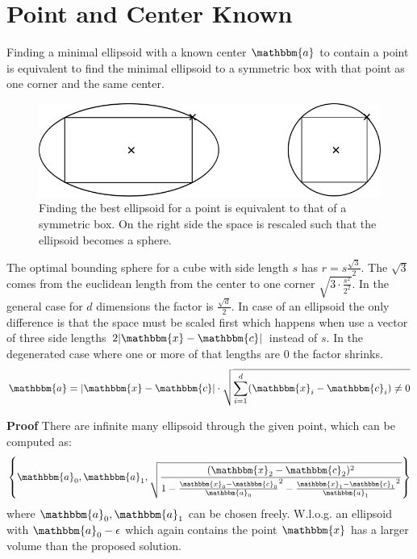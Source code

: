\documentclass[english,10pt,a4paper,twocolumn,colorscheme=green]{orarticle}
\begin{document}
	\section{Point and Center Known}
	
	Finding a minimal ellipsoid with a known center $\mathbbm{a}$ to contain a point is equivalent to find the minimal ellipsoid to a symmetric box with that point as one corner and the same center.
	
	\begin{figure}[h]
	\includegraphics[width=\linewidth]{img/ellipsoidpointfitting}
	\caption{Finding the best ellipsoid for a point is equivalent to that of a symmetric box. On the right side the space is rescaled such that the ellipsoid becomes a sphere.}
	\end{figure}
	The optimal bounding sphere for a cube with side length $s$ has $r = s\frac{\sqrt{3}}{2}$. The $\sqrt{3}$ comes from the euclidean length from the center to one corner $\sqrt{3\cdot\frac{s^2}{2^2}}$. In the general case for $d$ dimensions the factor is $\frac{\sqrt{d}}{2}$. In case of an ellipsoid the only difference is that the space must be scaled first which happens when use a vector of three side lengths $2\lvert\mathbbm{x}-\mathbbm{c}\rvert$ instead of $s$. In the degenerated case where one or more of that lengths are 0 the factor shrinks.
	\begin{align}
		\mathbbm{a} = \lvert\mathbbm{x}-\mathbbm{c}\rvert\cdot\sqrt{\sum_{i=1}^d (\mathbbm{x}_i-\mathbbm{c}_i) \neq 0}
	\end{align}
	
	\textbf{Proof} There are infinite many ellipsoid through the given point, which can be computed as:
	\begin{align*}
		\left\{\mathbbm{a}_0, \mathbbm{a}_1, \sqrt{\frac{(\mathbbm{x}_2-\mathbbm{c}_2)^2}{1-\frac{\mathbbm{x}_0-\mathbbm{c}_0}{\mathbbm{a}_0}^2 - \frac{\mathbbm{x}_1-\mathbbm{c}_1}{\mathbbm{a}_1}^2}}\right\}
	\end{align*}
	where $\mathbbm{a}_0, \mathbbm{a}_1$ can be chosen freely.
	W.l.o.g. an ellipsoid with $\mathbbm{a}_0 - \epsilon$ which again contains the point $\mathbbm{x}$ has a larger volume than the proposed solution.
	
\end{document}
